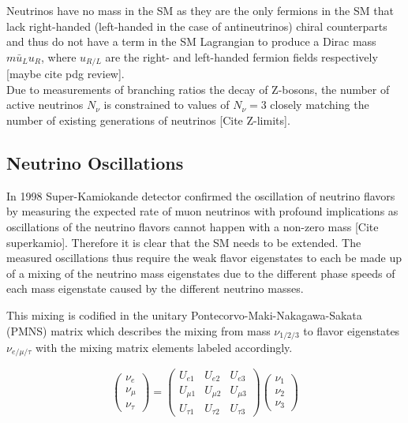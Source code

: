 \documentclass[a4paper,12pt,numbered]{article}
\begin{document}
Neutrinos have no mass in the SM as they are the only fermions in the SM that lack right-handed (left-handed in the case of antineutrinos) chiral counterparts and thus do not have a term in the SM Lagrangian to produce a Dirac mass $m \bar{u}_L u_R$, where $u_{R/L}$ are the right- and left-handed fermion fields respectively [maybe cite pdg review]. 
\\
Due to measurements of branching ratios the decay of Z-bosons, the number of active neutrinos $N_\nu$ is constrained to values of $N_\nu =3$ closely matching the number of existing generations of neutrinos [Cite Z-limits].

\subsection{Neutrino Oscillations}

In 1998 Super-Kamiokande detector confirmed the oscillation of neutrino flavors by measuring the expected rate of muon neutrinos  with profound implications as oscillations of the neutrino flavors cannot happen with a non-zero mass [Cite superkamio]. Therefore it is clear that the SM needs to be extended.
The measured oscillations thus require the weak flavor eigenstates to each be made up of a mixing of the neutrino mass eigenstates due to the different phase speeds of each mass eigenstate caused by the different neutrino masses.

This mixing is codified in the unitary Pontecorvo-Maki-Nakagawa-Sakata (PMNS) matrix which describes the mixing from mass $\nu_{1/2/3}$ to flavor eigenstates $\nu_{e/\mu/\tau}$ with the mixing matrix elements labeled accordingly.

\begin{equation}
\begin{pmatrix}
\nu_e \\
\nu_\mu \\
\nu_\tau
\end{pmatrix}
=
\begin{pmatrix}
U_{e1} & U_{e2} & U_{e3} \\
U_{\mu 1} & U_{\mu 2} & U_{\mu 3} \\
U_{\tau 1} & U_{\tau 2} & U_{\tau 3}
\end{pmatrix}
\begin{pmatrix}
\nu_1 \\
\nu_2 \\
\nu_3
\end{pmatrix}
\end{equation}
\end{document}
